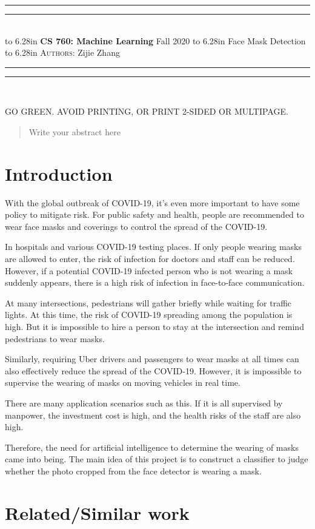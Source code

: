 \documentclass{article}
\newcommand{\lecture}[2]{
\pagestyle{myheadings}
\thispagestyle{plain}
\newpage
\noindent
\begin{center}
\rule{\textwidth}{1.6pt}\vspace*{-\baselineskip}\vspace*{2pt} %
\rule{\textwidth}{0.4pt}\\[1\baselineskip] %
\vbox{\vspace{2mm}
\hbox to 6.28in { {\bf CS 760: Machine Learning} \hfill Fall 2020 }
\vspace{4mm}
\hbox to 6.28in { {\Large \hfill #1  \hfill} }
\vspace{4mm}
\hbox to 6.28in { {\scshape Authors:}  #2 \hfill }}
\vspace{-2mm}
\rule{\textwidth}{0.4pt}\vspace*{-\baselineskip}\vspace{3.2pt} %
\rule{\textwidth}{1.6pt}\\[\baselineskip] %
\end{center}
\vspace*{4mm}
}
\begin{document}
\lecture{Face Mask Detection}{Zijie Zhang}

\begin{center}
{\Large {\sf GO GREEN. AVOID PRINTING, OR PRINT 2-SIDED OR MULTIPAGE.}}
\end{center}

\begin{abstract}
Write your abstract here
\end{abstract}

\section{Introduction}
With the global outbreak of COVID-19, it's even more important to have some policy to mitigate risk. For public safety and health, people are recommended to wear face masks and coverings to control the spread of the COVID-19.

In hospitals and various COVID-19 testing places. If only people wearing masks are allowed to enter, the risk of infection for doctors and staff can be reduced. However, if a potential COVID-19 infected person who is not wearing a mask suddenly appears, there is a high risk of infection in face-to-face communication.

At many intersections, pedestrians will gather briefly while waiting for traffic lights. At this time, the risk of COVID-19 spreading among the population is high. But it is impossible to hire a person to stay at the intersection and remind pedestrians to wear masks.

Similarly, requiring Uber drivers and passengers to wear masks at all times can also effectively reduce the spread of the COVID-19. However, it is impossible to supervise the wearing of masks on moving vehicles in real time.

There are many application scenarios such as this. If it is all supervised by manpower, the investment cost is high, and the health risks of the staff are also high.

Therefore, the need for artificial intelligence to determine the wearing of masks came into being. The main idea of this project is to construct a classifier to judge whether the photo cropped from the face detector is wearing a mask.

\section{Related/Similar work}
\end{document}

